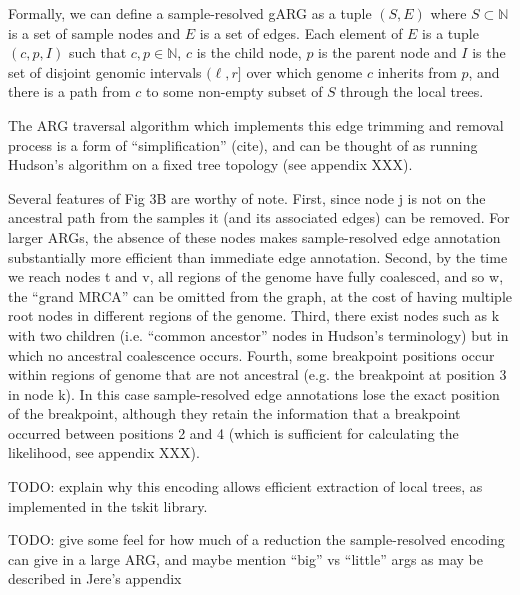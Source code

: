 \documentclass{article}
\begin{document}
Formally, we can define a sample-resolved gARG as a tuple $(S, E)$
where $S \subset \mathbb{N}$ is a set of sample nodes and
$E$ is a set of edges. Each element of $E$
is a tuple $(c, p, I)$ such that $c, p \in \mathbb{N}$,
$c$ is the child node, $p$ is the parent node and $I$ is the set of
disjoint genomic intervals $(\ell, r]$
over which genome $c$ inherits from $p$, and there is a path from
$c$ to some non-empty subset of $S$ through the local trees.

The ARG traversal algorithm which implements this edge trimming and removal process
is a form of ``simplification'' (cite), and can be thought of as running Hudson's algorithm
on a fixed tree topology (see appendix XXX).


Several features of Fig 3B are worthy of note. First, since node \textsf{j} is not on
the ancestral path from the samples it (and its associated edges) can be removed.
For larger ARGs, the absence of these nodes makes sample-resolved edge annotation
substantially more efficient than immediate edge annotation.
Second, by the time we reach
nodes \textsf{t} and \textsf{v}, all regions of the genome have fully coalesced, and so
\textsf{w}, the ``grand MRCA'' can be omitted from the graph, at the cost of having
multiple root nodes in different regions of the genome.
Third, there exist nodes such as
\textsf{k} with two children (i.e. ``common ancestor'' nodes in Hudson's terminology)
but in which no ancestral coalescence occurs. Fourth, some breakpoint positions occur
within regions of genome that are not ancestral (e.g. the breakpoint at position 3 in
node \textsf{k}). In this case sample-resolved edge annotations lose the exact position of
the breakpoint, although they retain the information that a breakpoint occurred between
positions 2 and 4 (which is sufficient for calculating the likelihood, see appendix XXX).

TODO: explain why this encoding allows efficient extraction of local trees, as implemented in the tskit library.


TODO: give some feel for how much of a reduction the sample-resolved encoding can give in a large ARG, and
maybe mention ``big'' vs ``little'' args as may be described in Jere's appendix
\end{document}

